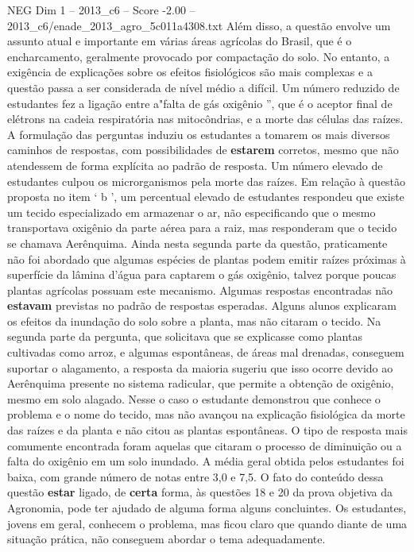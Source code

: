 \begin{textsample}{NEG Dim 1 – 2013\_c6 – Score -2.00 – 2013\_c6/enade\_2013\_agro\_5c011a4308.txt}
Além disso, a questão envolve um assunto atual e importante em várias áreas agrícolas do Brasil, que é o encharcamento, geralmente provocado por compactação do solo.
No entanto, a exigência de explicações sobre os efeitos fisiológicos são mais complexas e a questão passa a ser considerada de nível médio a difícil.
Um número reduzido de estudantes fez a ligação entre a"falta de gás oxigênio ”, que é o aceptor final de elétrons na cadeia respiratória nas mitocôndrias, e a morte das células das raízes.
A formulação das perguntas induziu os estudantes a tomarem os mais diversos caminhos de respostas, com possibilidades de \textbf{estarem} corretos, mesmo que não atendessem de forma explícita ao padrão de resposta.
Um número elevado de estudantes culpou os microrganismos pela morte das raízes.
Em relação à questão proposta no item ‘ b ’, um percentual elevado de estudantes respondeu que existe um tecido especializado em armazenar o ar, não especificando que o mesmo transportava oxigênio da parte aérea para a raiz, mas responderam que o tecido se chamava Aerênquima.
Ainda nesta segunda parte da questão, praticamente não foi abordado que algumas espécies de plantas podem emitir raízes próximas à superfície da lâmina d'água para captarem o gás oxigênio, talvez porque poucas plantas agrícolas possuam este mecanismo.
Algumas respostas encontradas não \textbf{estavam} previstas no padrão de respostas esperadas.
Alguns alunos explicaram os efeitos da inundação do solo sobre a planta, mas não citaram o tecido.
Na segunda parte da pergunta, que solicitava que se explicasse como plantas cultivadas como arroz, e algumas espontâneas, de áreas mal drenadas, conseguem suportar o alagamento, a resposta da maioria sugeriu que isso ocorre devido ao Aerênquima presente no sistema radicular, que permite a obtenção de oxigênio, mesmo em solo alagado.
Nesse o caso o estudante demonstrou que conhece o problema e o nome do tecido, mas não avançou na explicação fisiológica da morte das raízes e da planta e não citou as plantas espontâneas.
O tipo de resposta mais comumente encontrada foram aquelas que citaram o processo de diminuição ou a falta do oxigênio em um solo inundado.
A média geral obtida pelos estudantes foi baixa, com grande número de notas entre 3,0 e 7,5.
O fato do conteúdo dessa questão \textbf{estar} ligado, de \textbf{certa} forma, às questões 18 e 20 da prova objetiva da Agronomia, pode ter ajudado de alguma forma alguns concluintes.
Os estudantes, jovens em geral, conhecem o problema, mas ficou claro que quando diante de uma situação prática, não conseguem abordar o tema adequadamente.

\end{textsample}
